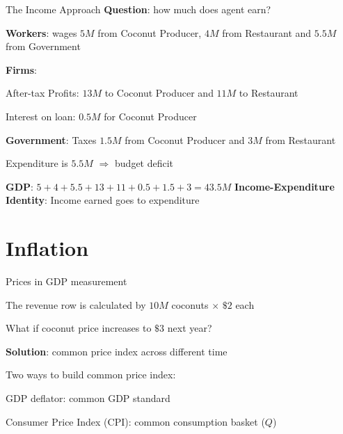 \documentclass[11pt,aspectratio=169,usenames,dvipsnames]{beamer}
\let\tempone\itemize
\let\temptwo\enditemize
\renewenvironment{itemize}{\tempone\addtolength{\itemsep}{\fill}}{\temptwo}
\let\tempa\enumerate
\let\tempb\endenumerate
\renewenvironment{enumerate}{\tempa\addtolength{\itemsep}{\fill}}{\tempb}
\begin{document}
\begin{frame}{The Income Approach}
\label{slide:Income_Approach}
    \textbf{Question}: \alert{how much does agent earn?}
    \begin{itemize}
        \item \textbf{Workers}: wages $ 5M $ from Coconut Producer, $ 4M $ from Restaurant and $ 5.5M $ from Government
        \item \textbf{Firms}:
        \begin{itemize}
            \item After-tax Profits: $ 13M $ to Coconut Producer and $ 11M $ to Restaurant
            \item Interest on loan: $ 0.5M $ for Coconut Producer
        \end{itemize}
        \item \textbf{Government}: Taxes $ 1.5M $ from Coconut Producer and $ 3M $ from Restaurant
        \begin{itemize}
            \item Expenditure is $ 5.5M $ $ \Rightarrow  $ \alert{budget deficit}
        \end{itemize}
        \item \textbf{GDP}: $5 + 4 + 5.5 + 13 + 11 + 0.5 + 1.5 + 3 = 43.5M$
    \end{itemize}
    \textbf{Income-Expenditure Identity}: Income earned goes to expenditure
\end{frame}

\section{Inflation}
\label{sec:Inflation}

\begin{frame}{Prices in GDP measurement}
\label{slide:Prices_in_GDP_measurement}
\begin{itemize}
    \item The \alert{revenue} row is calculated by $ 10M $ coconuts $ \times $ $ \$2 $ each
    \begin{itemize}
        \item What if coconut price increases to $ \$3 $ next year?
    \end{itemize}
    \item \textbf{Solution}: common \alert{price index} across different time

    \item Two ways to build common price index:
    \begin{enumerate}
        \item GDP deflator: common \alert{GDP} standard
        \item Consumer Price Index (CPI): common \alert{consumption basket} ($Q$)
    \end{enumerate}
\end{itemize}

\end{frame}
\end{document}
